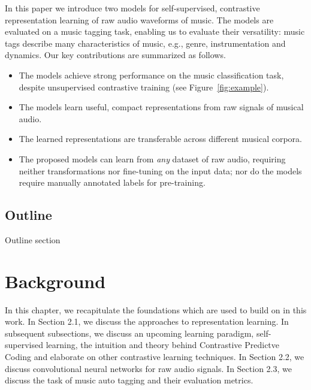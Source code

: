\documentclass{report}
\begin{document}

In this paper we introduce two models for self-supervised, contrastive representation learning of raw audio waveforms of music. %
The models are evaluated on a music tagging task, enabling us to evaluate their versatility: music tags describe many characteristics of music, e.g., genre, instrumentation and dynamics. Our key contributions are summarized as follows.
\begin{itemize}
    \item The models achieve strong performance on the music classification task, despite unsupervised contrastive training (see Figure~\ref{fig:example}).
    \item The models learn useful, compact representations from raw signals of musical audio.
    \item The learned representations are transferable across different musical corpora.
    \item The proposed models can learn from \emph{any} dataset of raw audio, requiring neither transformations nor fine-tuning on the input data; nor do the models require manually annotated labels for pre-training.
\end{itemize}

\section{Outline}
Outline section



\chapter{Background}
In this chapter, we recapitulate the foundations which are used to build on in this work. In Section 2.1, we discuss the approaches to representation learning. In subsequent subsections, we discuss an upcoming learning paradigm, self-supervised learning, the intuition and theory behind Contrastive Predictve Coding \cite{oord_representation_2019} and elaborate on other contrastive learning techniques. In Section 2.2, we discuss convolutional neural networks for raw audio signals. In Section 2.3, we discuss the task of music auto tagging and their evaluation metrics.
\end{document}
